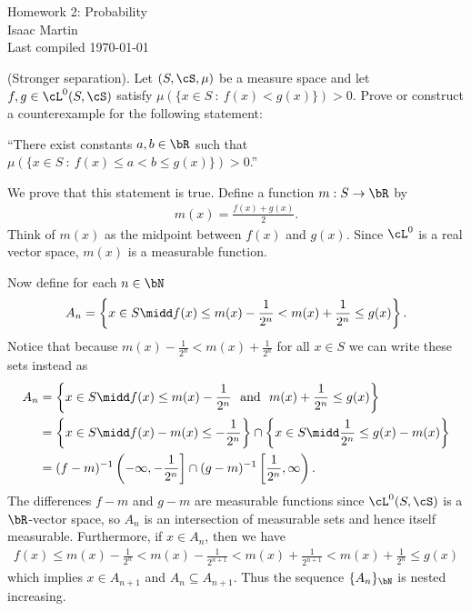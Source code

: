 \pagestyle{empty}
	\LARGE
\begin{center}
	Homework 2: Probability \\
	\Large
	Isaac Martin \\
    Last compiled \today
\end{center}
\normalsize
\vspace{-2mm}
\hru
{}
\begin{homework}[e]
	 (Stronger separation). Let $(S,\cS,\mu)$ be a measure space and let $f,g \in \cL^0(S,\cS)$ satisfy $\mu(\{x\in S ~:~ f(x) < g(x)\}) > 0$. Prove or construct a counterexample for the following statement:
	\begin{center}
		``There exist constants $a,b \in \bR$ such that $\mu(\{x \in S ~:~ f(x) \leq a < b \leq g(x)\}) > 0$.''
	\end{center}
	\begin{prf}
		We prove that this statement is true. Define a function $m:S\to \bR$ by
		\begin{align*}
			m(x) = \frac{f(x) + g(x)}{2}.
		\end{align*}
		Think of $m(x)$ as the midpoint between $f(x)$ and $g(x)$. Since $\cL^0$ is a real vector space, $m(x)$ is a measurable function.

		Now define for each $n \in \bN$
		\begin{align*}
			A_n = \left\{x \in S \midd f(x) \leq m(x) - \frac{1}{2^n} < m(x) + \frac{1}{2^n} \leq g(x)\right\}.
		\end{align*}
		Notice that because $m(x) - \frac{1}{2^n} < m(x) + \frac{1}{2^n}$ for all $x \in S$ we can write these sets instead as
		\begin{align*}
			A_n &= \left\{x \in S \midd f(x) \leq m(x) - \frac{1}{2^n} ~\text{ and  }~ m(x) + \frac{1}{2^n} \leq g(x)\right\} \\
				&= \left\{x \in S \midd f(x) - m(x)\leq - \frac{1}{2^n}\right\} \cap \left\{x \in S \midd \frac{1}{2^n} \leq g(x) - m(x)\right\} \\
				&= (f - m)^{-1}\left(-\infty, -\frac{1}{2^n}\right] \cap (g - m)^{-1}\left[\frac{1}{2^n},\infty\right).
		\end{align*}
		The differences $f - m$ and $g - m$ are measurable functions since $\cL^0(S,\cS)$ is a $\bR$-vector space, so $A_n$ is an intersection of measurable sets and hence itself measurable. Furthermore, if $x \in A_n$, then we have
		\begin{align*}
			f(x) \leq m(x) - \frac{1}{2^n} < m(x) - \frac{1}{2^{n+1}} < m(x) + \frac{1}{2^{n+1}} < m(x) + \frac{1}{2^n} \leq g(x)
		\end{align*}
		which implies $x \in A_{n+1}$ and $A_n \subseteq A_{n+1}$. Thus the sequence $\{A_n\}_{\bN}$ is nested increasing.


\end{prf}
\end{homework}
